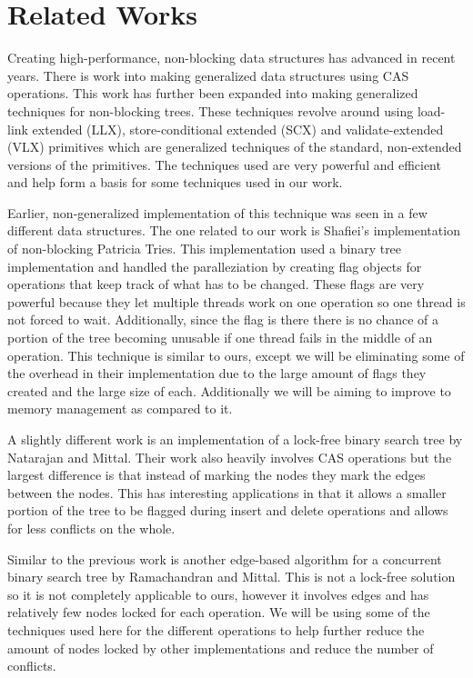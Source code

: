 \documentclass[conference]{IEEEtran}
\begin{document}
\section{Related Works}
Creating high-performance, non-blocking data structures has advanced in recent years. There is work into making generalized data structures using CAS operations. \cite{Brown2013} This work has further been expanded into making generalized techniques for non-blocking trees. \cite{Brown2014} These techniques revolve around using load-link extended (LLX), store-conditional extended (SCX) and validate-extended (VLX) primitives which are generalized techniques of the standard, non-extended versions of the primitives. \cite{Brown2013, Brown2014} The techniques used are very powerful and efficient and help form a basis for some techniques used in our work. 
\par
Earlier, non-generalized implementation of this technique was seen in a few different data structures. The one related to our work is Shafiei's implementation of non-blocking Patricia Tries. \cite{Shafiei2013} This implementation used a binary tree implementation and handled the paralleziation by creating flag objects for operations that keep track of what has to be changed. These flags are very powerful because they let multiple threads work on one operation so one thread is not forced to wait.  Additionally, since the flag is there there is no chance of a portion of the tree becoming unusable if one thread fails in the middle of an operation. \cite{Shafiei2013, Howley2012} This technique is similar to ours, except we will be eliminating some of the overhead in their implementation due to the large amount of flags they created and the large size of each. Additionally we will be aiming to improve to memory management as compared to it. 
\par
A slightly different work is an implementation of a lock-free binary search tree by Natarajan and Mittal. Their work also heavily involves CAS operations but the largest difference is that instead of marking the nodes they mark the edges between the nodes.\cite{Natarajan2014} This has interesting applications in that it allows a smaller portion of the tree to be flagged during insert and delete operations and allows for less conflicts on the whole. 
\par
Similar to the previous work is another edge-based algorithm for a concurrent binary search tree by Ramachandran and Mittal. This is not a lock-free solution so it is not completely applicable to ours, however it involves edges and has relatively few nodes locked for each operation. \cite{Ramachandran2015} We will be using some of the techniques used here for the different operations to help further reduce the amount of nodes locked by other implementations and reduce the number of conflicts. 
\end{document}
